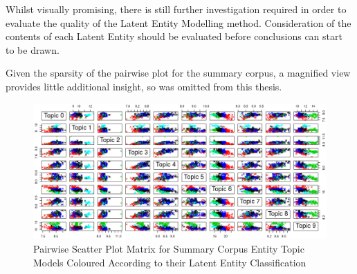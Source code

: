 \documentclass[10pt]{report}
\begin{document}
Whilst visually promising, there is still further investigation required in order to evaluate the quality of the Latent Entity Modelling method. Consideration of the contents of each Latent Entity should be evaluated before conclusions can start to be drawn.

Given the sparsity of the pairwise plot for the summary corpus, a magnified view provides little additional insight, so was omitted from this thesis.

\clearpage
\begin{figure}[h!]
  \centering
\includegraphics[angle=-90,scale=0.65]{hp_summary_latent_clusters}
\caption{Pairwise Scatter Plot Matrix for Summary Corpus Entity Topic Models Coloured According to their Latent Entity Classification\label{hp_summ_le_pairs}}
\end{figure}

\clearpage
\end{document}
